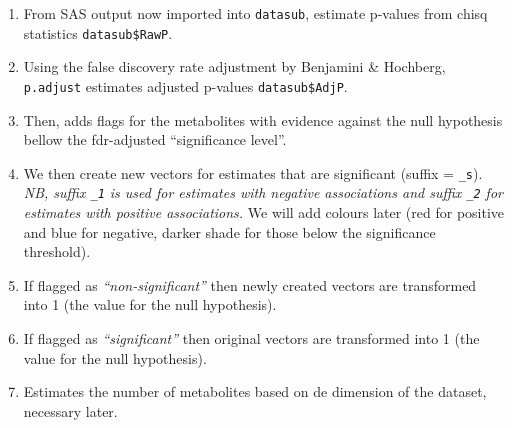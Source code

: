 \documentclass[
]{article}
\providecommand{\tightlist}{%
  \setlength{\itemsep}{0pt}\setlength{\parskip}{0pt}}
\begin{document}
\begin{enumerate}
\def\labelenumi{\arabic{enumi}.}
\tightlist
\item
  From SAS output now imported into \texttt{datasub}, estimate p-values
  from chisq statistics \texttt{datasub\$RawP}.
\item
  Using the false discovery rate adjustment by Benjamini \& Hochberg,
  \texttt{p.adjust} estimates adjusted p-values \texttt{datasub\$AdjP}.
\item
  Then, adds flags for the metabolites with evidence against the null
  hypothesis bellow the fdr-adjusted ``significance level''.
\item
  We then create new vectors for estimates that are significant (suffix
  = \texttt{\_s}). \emph{NB, suffix \texttt{\_1} is used for estimates
  with negative associations and suffix \texttt{\_2} for estimates with
  positive associations.} We will add colours later (red for positive
  and blue for negative, darker shade for those below the significance
  threshold).
\item
  If flagged as \emph{``non-significant''} then newly created vectors
  are transformed into 1 (the value for the null hypothesis).
\item
  If flagged as \emph{``significant''} then original vectors are
  transformed into 1 (the value for the null hypothesis).
\item
  Estimates the number of metabolites based on de dimension of the
  dataset, necessary later.
\end{enumerate}
\end{document}
